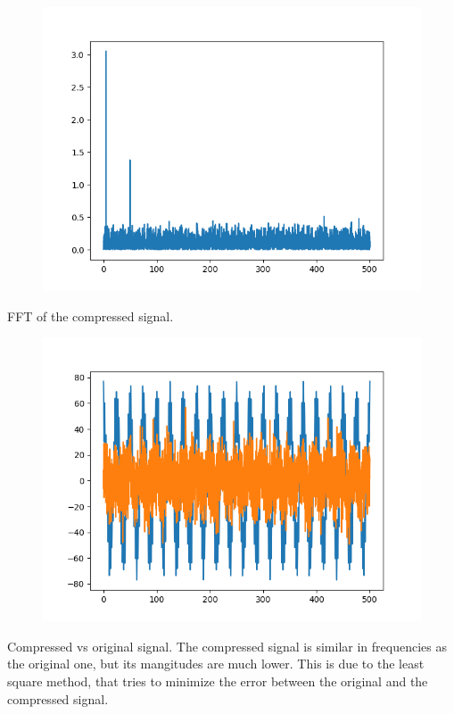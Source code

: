 \documentclass{article}
\begin{document}
\begin{figure}[H]
    \includegraphics[width=\textwidth]{4d.png}
\end{figure}
FFT of the compressed signal.
\begin{figure}[H]
    \includegraphics[width=\textwidth]{4e.png}
\end{figure}
Compressed vs original signal. The compressed signal is similar in frequencies as the original one, but its mangitudes are much lower. This is due to the least square method, that tries to minimize the error between the original and the compressed signal.
\end{document}
